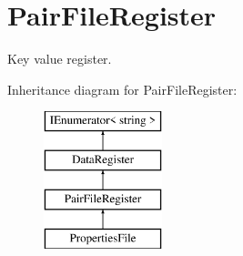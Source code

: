 \hypertarget{classOTA_1_1Misc_1_1PairFileRegister}{}\section{Pair\+File\+Register}
\label{classOTA_1_1Misc_1_1PairFileRegister}


Key value register.  


Inheritance diagram for Pair\+File\+Register\+:\begin{figure}[H]
\begin{center}
\leavevmode
\includegraphics[height=4.000000cm]{classOTA_1_1Misc_1_1PairFileRegister}
\end{center}
\end{figure}
